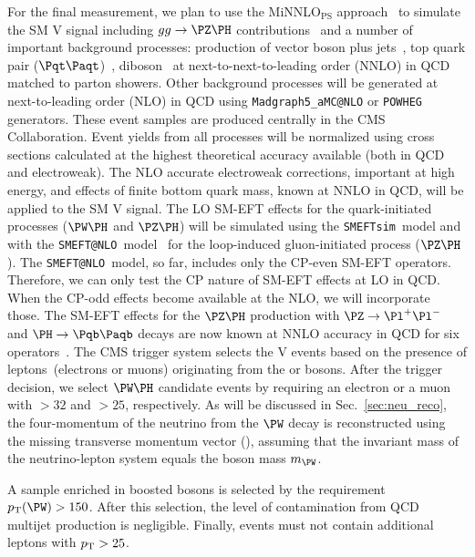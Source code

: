\documentclass[a4paper,11pt]{article}
\newcommand{\Pb}{{{\Pqb}}\xspace}
\newcommand{\Pt}{{{\Pqt}}\xspace}
\newcommand{\PAb}{{{{\Paqb}}}\xspace}
\newcommand{\PAt}{{{{\Paqt}}}\xspace}
\renewcommand{\PV}{{{{V}}}\xspace}
\newcommand{\VH}{{{\PV}{\PH}}\xspace}
\begin{document}
For the final measurement, we plan to use the MiNNLO$_{\text{PS}}$ approach~\cite{Monni:2019whf,Monni:2020nks} to simulate the SM \VH signal including $gg \rightarrow \PZ\PH$ contributions~\cite{Zanoli:2021iyp} and a number of important background processes: production of vector boson plus jets~\cite{Monni:2020nks}, top quark pair ($\Pt\PAt$)~\cite{Mazzitelli:2020jio,Mazzitelli:2021mmm}, diboson~\cite{Lombardi:2021rvg,Buonocore:2021fnj} at next-to-next-to-leading order (NNLO) in QCD matched to parton showers. 
Other background processes will be generated at next-to-leading order (NLO) in QCD using \texttt{Madgraph5\_aMC@NLO} or \texttt{POWHEG}~\cite{Nason:2004rx,Powheg_ref,PowhegBox_ref} generators.
These event samples are produced centrally in the CMS Collaboration.
Event yields from all processes will be normalized using cross sections calculated at the highest theoretical accuracy available (both in QCD and electroweak). 
The NLO accurate electroweak corrections, important at high energy, and effects of finite bottom quark mass, known at NNLO in QCD, will be applied to the SM \VH signal. 
The LO SM-EFT effects for the quark-initiated processes ($\PW\PH$ and $\PZ\PH$) will be simulated using the \texttt{SMEFTsim}~model and with the \texttt{SMEFT@NLO}~model~\cite{Degrande:2020evl} for the loop-induced gluon-initiated process ($\PZ\PH$). 
The \texttt{SMEFT@NLO}~model, so far, includes only the CP-even SM-EFT operators. 
Therefore, we can only test the CP nature of SM-EFT effects at LO in QCD.
When the CP-odd effects become available at the NLO, we will incorporate those.
The SM-EFT effects for the $\PZ\PH$ production with $\PZ \rightarrow  \Pl^{+}\Pl^{-}$ and $\PH \rightarrow \Pb\PAb$ decays are now known at NNLO accuracy in QCD for six operators~\cite{Haisch:2022nwz}. 
The CMS trigger system selects the \VH events based on the presence of leptons~(electrons or muons) originating from the \PW or \PZ bosons.
After the trigger decision, we select $\PW\PH$ candidate events by requiring an electron or a muon with \pt$>32$ and $>25$\GeV, respectively. 
As will be discussed in Sec.~\ref{sec:neu_reco}, the four-momentum of the neutrino from the $\PW$ decay is reconstructed using the missing transverse momentum vector (\ptvecmiss), assuming that the invariant mass of the neutrino-lepton system equals the \PW boson mass $m_{\PW}$.

A sample enriched in boosted \PW bosons is selected by the requirement $\pt(\PW) > 150$\GeV. 
After this selection, the level of contamination from QCD multijet production is negligible.
Finally, events must not contain additional leptons with $p_{\mathrm{T}}>25$\GeV.
\end{document}
